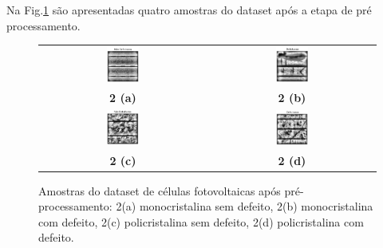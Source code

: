\documentclass[conference]{IEEEtran}
\begin{document}
Na Fig.\ref{fig:amostras-dataset} são apresentadas quatro amostras do dataset
após a etapa de pré processamento.

\begin{figure}[htbp]
    \centering
    \begin{tabular}{cc}
        \includegraphics[width=0.20\textwidth]{images/mono-no-defect.png} &
        \includegraphics[width=0.20\textwidth]{images/mono-defect.png}
        \\
        \textbf{2 (a)}                                                    &
        \textbf{2 (b)}                                                      \\
        \includegraphics[width=0.20\textwidth]{images/poly-no-defect.png} &
        \includegraphics[width=0.20\textwidth]{images/poly-defect.png}
        \\
        \textbf{2 (c)}                                                    &
        \textbf{2 (d)}                                                      \\
    \end{tabular}
    \caption{Amostras do dataset de células fotovoltaicas após
        pré-processamento: 2(a)
        monocristalina
        sem defeito, 2(b) monocristalina com defeito, 2(c) policristalina sem
        defeito,
        2(d) policristalina com defeito. \cite{Deitsch2021}}
    \label{fig:amostras-dataset}
\end{figure}
\end{document}
